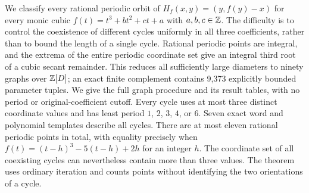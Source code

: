 We classify every rational periodic orbit of
$H_f(x,y)=(y,f(y)-x)$ for every monic cubic
$f(t)=t^3+bt^2+ct+a$ with $a,b,c\in\mathbb{Z}$.
The difficulty is to control the coexistence of different cycles
uniformly in all three coefficients, rather than to bound the length
of a single cycle. Rational periodic points are integral, and the
extrema of the entire periodic coordinate set give an integral third
root of a cubic secant remainder. This reduces all sufficiently large
diameters to ninety graphs over $\mathbb{Z}[D]$; an exact finite complement
contains 9,373 explicitly bounded parameter tuples. We give the full
graph procedure and its result tables, with no period or original-coefficient
cutoff. Every cycle uses at most three distinct coordinate
values and has least period $1$, $2$, $3$, $4$, or $6$. Seven exact
word and polynomial templates describe all cycles. There are at most
eleven rational periodic points in total, with equality precisely when
$f(t)=(t-h)^3-5(t-h)+2h$ for an integer $h$.
The coordinate set of all coexisting cycles can nevertheless contain
more than three values. The theorem uses ordinary iteration and counts
points without identifying the two orientations of a cycle.
